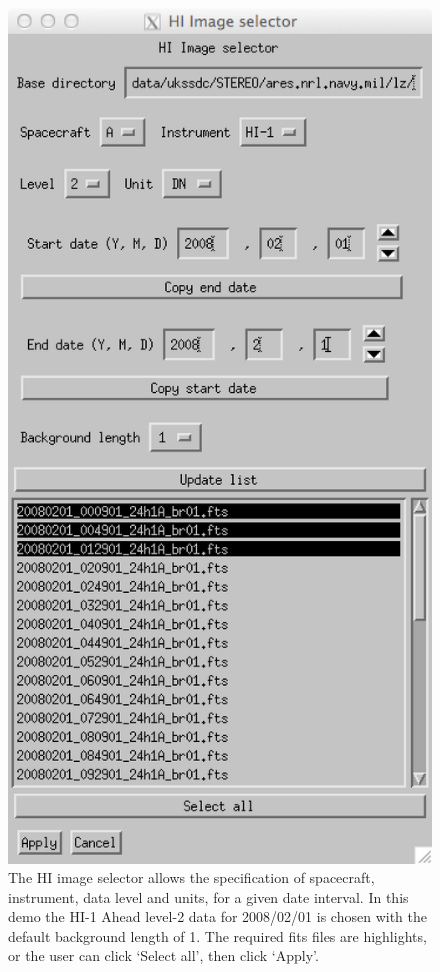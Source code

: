 \documentclass[12pt, a4paper, oneside]{article}
\begin{document}
\begin{figure}[]
\centering
\includegraphics[scale=0.75]{../images/hi_image_selector.png}
\caption{The HI image selector allows the specification of spacecraft, instrument, data level and units, for a given date interval. In this demo the HI-1 Ahead level-2 data for 2008/02/01 is chosen with the default background length of 1. The required fits files are highlights, or the user can click `Select all', then click `Apply'.}
\label{hi_image_selector}
\end{figure}
\end{document}
